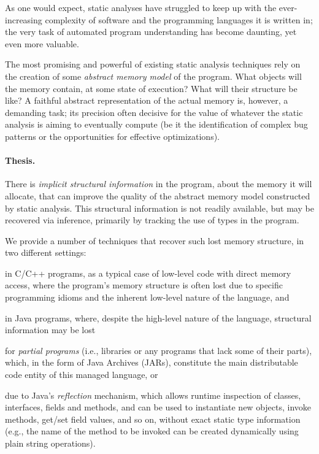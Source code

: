 As one would expect, static analyses have struggled to keep up with
the ever-increasing complexity of software and the programming
languages it is written in; the very task of automated program
understanding has become daunting, yet even more valuable.

The most promising and powerful of existing static analysis techniques
rely on the creation of some \emph{abstract memory model} of the
program. What objects will the memory contain, at some state of
execution? What will their structure be like?  A faithful abstract
representation of the actual memory is, however, a demanding task; its
precision often decisive for the value of whatever the static
analysis is aiming to eventually compute (be it the identification of
complex bug patterns or the opportunities for effective
optimizations).

\paragraph*{Thesis.}
\begin{displayquote}
  There is \emph{implicit structural information} in the program,
  about the memory it will allocate, that can improve the quality of
  the abstract memory model constructed by static analysis. This
  structural information is not readily available, but may be
  recovered via inference, primarily by tracking the use of types in
  the program.
\end{displayquote}

We provide a number of techniques that recover such
lost memory structure, in two different settings:
\begin{inparaenum}[(1)]
\item in C/C++ programs, as a typical case of low-level code with
  direct memory access, where the program's memory structure is often
  lost due to specific programming idioms and the inherent low-level
  nature of the language, and
\item in Java programs, where, despite the high-level nature of the
  language, structural information may be lost
  \begin{inparaenum}[(a)]
  \item for \emph{partial programs} (i.e., libraries or any programs that
    lack some of their parts), which, in the form of Java Archives
    (JARs), constitute the main distributable code entity of this
    managed language, or
  \item due to Java's \emph{reflection} mechanism, which allows
    runtime inspection of classes, interfaces, fields and methods, and
    can be used to instantiate new objects, invoke methods, get/set
    field values, and so on, without exact static type information
    (e.g., the name of the method to be invoked can be created
    dynamically using plain string operations).
  \end{inparaenum}
\end{inparaenum}


